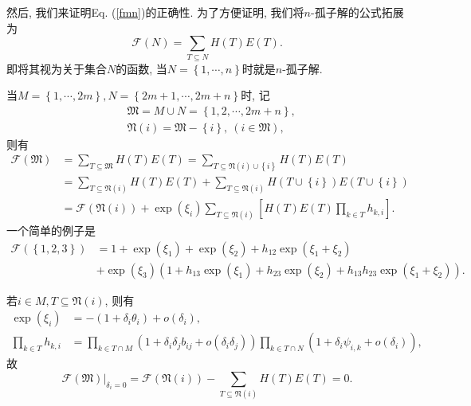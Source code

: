 \documentclass[12pt,a4paper,UTF8]{article}
\numberwithin{equation}{section}
\newcommand{\sbrace}[1]{\left(#1\right)}
\newcommand{\mbrace}[1]{\left[#1\right]}
\newcommand{\bbrace}[1]{\left\{#1\right\}}
\newcommand{\eval}[2]{\left.{#1}\right|_{#2}}
\newcommand{\FM}{\mathfrak{M}}
\newcommand{\FN}{\mathfrak{N}}
\newcommand{\CF}{\mathcal{F}}
\newcommand{\refeqn}[1]{Eq. (\ref{#1})}
\begin{document}
然后, 我们来证明\refeqn{fmn}的正确性. 为了方便证明, 我们将$n$-孤子解的公式拓展为
\begin{equation}
  \CF(N)=\sum_{T\subseteq N}{H(T)E(T)}.
\end{equation}
即将其视为关于集合$N$的函数, 当$N=\bbrace{1,\cdots,n}$时就是$n$-孤子解. 

当$M=\bbrace{1,\cdots,2m},N=\bbrace{2m+1,\cdots,2m+n}$时, 记
\begin{equation}
\begin{aligned}
  &\FM=M\cup N = \bbrace{1,2,\cdots,2m+n}, \\ 
  &\FN(i)=\FM - \bbrace{i}, ~(i\in \FM),
\end{aligned}
\end{equation}
则有
\begin{equation}
\begin{aligned}
  \CF(\FM)&=\sum_{T\subseteq \FM}{H(T)E(T)}=\sum_{T\subseteq \FN(i)\cup \bbrace{i}}{H(T)E(T)} \\
  &=\sum_{T\subseteq \FN(i)}{H(T)E(T)}+\sum_{T\subseteq \FN(i)}{H(T\cup \bbrace{i})E(T\cup \bbrace{i})} \\ 
  &=\CF(\FN(i))+\exp(\xi_i)\sum_{T\subseteq \FN(i)}\mbrace{H(T)E(T)\prod_{k\in T}{h_{k,i}}}. 
\end{aligned}
\end{equation}
一个简单的例子是
\begin{equation}
\begin{aligned}
\CF(\bbrace{1,2,3})&=1+\exp(\xi_1)+\exp(\xi_2)+h_{12}\exp(\xi_1+\xi_2)  \\ 
&+\exp(\xi_3)\sbrace{1+h_{13}\exp(\xi_1)+h_{23}\exp(\xi_2)+h_{13}h_{23}\exp(\xi_1+\xi_2)}.
\end{aligned}
\end{equation}

若$i\in M,T\subseteq \FN(i)$, 则有
\begin{equation}
\begin{aligned}
  \exp(\xi_i)&=-(1+\delta_i \theta_i)+o(\delta_i), \\ 
  \prod_{k\in T}{h_{k,i}}&=\prod_{k\in T\cap M}\sbrace{1+\delta_i \delta_j b_{ij}+o(\delta_i \delta_j)}\prod_{k\in T \cap N}\sbrace{1+\delta_i \psi_{i,k}+o(\delta_i)} ,
\end{aligned}
\end{equation}
故
\begin{equation}
  \eval{\CF(\FM)}{\delta_i=0}=\CF(\FN(i))-\sum_{T\subseteq \FN(i)}{H(T)E(T)}=0. 
\end{equation}
\end{document}
